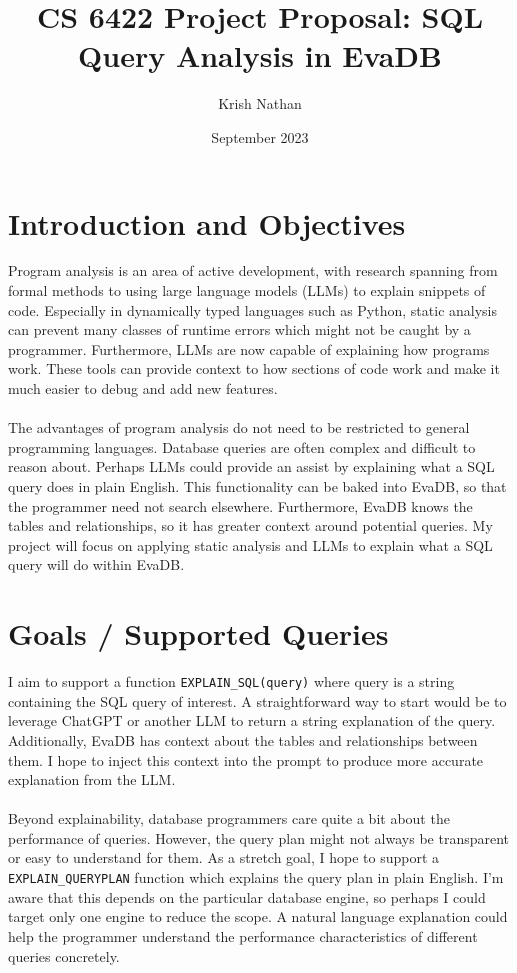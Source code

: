 \documentclass{article}
\title{CS 6422 Project Proposal: SQL Query Analysis in EvaDB}
\author{Krish Nathan}
\date{September 2023}
\begin{document}
\maketitle

\section{Introduction and Objectives}

Program analysis is an area of active development, with research spanning from formal methods to using large language models (LLMs) to explain snippets of code. Especially in dynamically typed languages such as Python, static analysis can prevent many classes of runtime errors which might not be caught by a programmer. Furthermore, LLMs are now capable of explaining how programs work. These tools can provide context to how sections of code work and make it much easier to debug and add new features.
\\ \\
The advantages of program analysis do not need to be restricted to general programming languages. Database queries are often complex and difficult to reason about. Perhaps LLMs could provide an assist by explaining what a SQL query does in plain English. This functionality can be baked into EvaDB, so that the programmer need not search elsewhere. Furthermore, EvaDB knows the tables and relationships, so it has greater context around potential queries. My project will focus on applying static analysis and LLMs to explain what a SQL query will do within EvaDB.

\section{Goals / Supported Queries}

I aim to support a function \texttt{EXPLAIN_SQL(query)} where query is a string containing the SQL query of interest. A straightforward way to start would be to leverage ChatGPT or another LLM to return a string explanation of the query. Additionally, EvaDB has context about the tables and relationships between them. I hope to inject this context into the prompt to produce more accurate explanation from the LLM. 
\\ \\
Beyond explainability, database programmers care quite a bit about the performance of queries. However, the query plan might not always be transparent or easy to understand for them. As a stretch goal, I hope to support a \texttt{EXPLAIN_QUERYPLAN} function which explains the query plan in plain English. I'm aware that this depends on the particular database engine, so perhaps I could target only one engine to reduce the scope. A natural language explanation could help the programmer understand the performance characteristics of different queries concretely.
\end{document}
